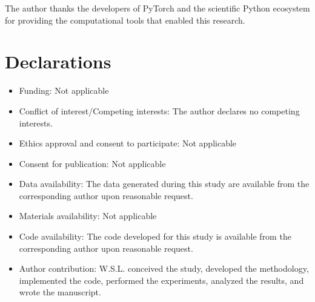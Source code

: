 \documentclass[pdflatex,sn-mathphys-num]{sn-jnl-modified}%
\theoremstyle{thmstyleone}%
\theoremstyle{thmstyletwo}%
\theoremstyle{thmstylethree}%
\begin{document}
\maketitle









\backmatter


The author thanks the developers of PyTorch and the scientific Python ecosystem for providing the computational tools that enabled this research.

\section*{Declarations}

\begin{itemize}
\item Funding: Not applicable
\item Conflict of interest/Competing interests: The author declares no competing interests.
\item Ethics approval and consent to participate: Not applicable
\item Consent for publication: Not applicable
\item Data availability: The data generated during this study are available from the corresponding author upon reasonable request.
\item Materials availability: Not applicable
\item Code availability: The code developed for this study is available from the corresponding author upon reasonable request.
\item Author contribution: W.S.L. conceived the study, developed the methodology, implemented the code, performed the experiments, analyzed the results, and wrote the manuscript.
\end{itemize}





\end{document}
